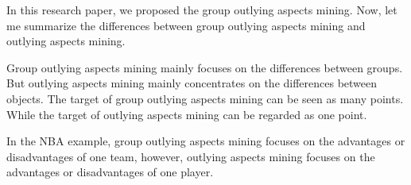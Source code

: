 \documentclass[
 size=14pt,
 paper=smartboard,  %
 mode=present, 		%
 display=slides, 	%
 style=tuliplab,  	%
 pauseslide,
 fleqn,leqno]{powerdot}
\begin{document}
\begin{slide}[toc=,bm=]{}
  \begin{note}
  In this research paper,
  we proposed the group outlying aspects mining.
  Now,
  let me summarize the differences between group outlying aspects mining and outlying aspects mining.
  
  Group outlying aspects mining mainly focuses on the differences between groups.
  But outlying aspects mining mainly concentrates on the differences between objects.
  The target of group outlying aspects mining can be seen as many points.
  While the target of outlying aspects mining can be regarded as one point.
  
  In the NBA example,
  group outlying aspects mining focuses on the advantages
  or disadvantages of one team,
  however,
  outlying aspects mining focuses on the advantages or disadvantages of one player.
  \end{note}
  
  \end{slide}
\end{document}
